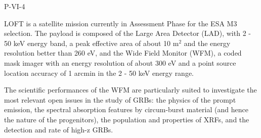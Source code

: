 P-VI-4


\bigskip



\bigskip

\noindent LOFT is a satellite mission currently in Assessment Phase for the
ESA M3 selection. The payload is composed of the Large Area
Detector (LAD), with 2 - 50 keV energy band, a peak effective area
of about 10 m$^{2}$ and the energy resolution better than 260 eV, and
the Wide Field Monitor (WFM), a coded mask imager with an energy
resolution of about 300 eV and a point source location accuracy of
1 arcmin in the 2 - 50 keV energy range.

The scientific performances of the WFM are particularly suited to
investigate the most relevant open issues in the study of GRBs: the
physics of the prompt emission, the spectral absorption features by
circum-burst material (and hence the nature of the progenitors),
the population and properties of XRFs, and the detection and rate of high-z GRBs.


